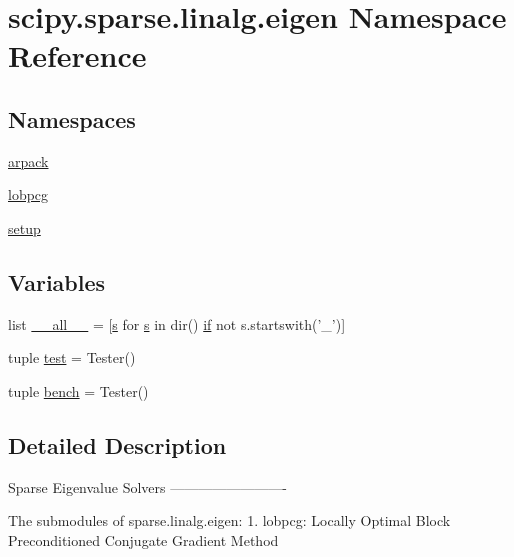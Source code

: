 \hypertarget{namespacescipy_1_1sparse_1_1linalg_1_1eigen}{}\section{scipy.\+sparse.\+linalg.\+eigen Namespace Reference}
\label{namespacescipy_1_1sparse_1_1linalg_1_1eigen}
\subsection*{Namespaces}
\begin{DoxyCompactItemize}
\item 
 \hyperlink{namespacescipy_1_1sparse_1_1linalg_1_1eigen_1_1arpack}{arpack}
\item 
 \hyperlink{namespacescipy_1_1sparse_1_1linalg_1_1eigen_1_1lobpcg}{lobpcg}
\item 
 \hyperlink{namespacescipy_1_1sparse_1_1linalg_1_1eigen_1_1setup}{setup}
\end{DoxyCompactItemize}
\subsection*{Variables}
\begin{DoxyCompactItemize}
\item 
list \hyperlink{namespacescipy_1_1sparse_1_1linalg_1_1eigen_ada87267193e73e0b8fb11d1f19f42e53}{\+\_\+\+\_\+all\+\_\+\+\_\+} = \mbox{[}\hyperlink{indexexpr_8h_ae024b0db549122b44c349ae28ec990dc}{s} for \hyperlink{indexexpr_8h_ae024b0db549122b44c349ae28ec990dc}{s} in dir() \hyperlink{minmax_8h_a30a0ee9fee303f01d9c5e6f669e0dfe9}{if} not s.\+startswith('\+\_\+')\mbox{]}
\item 
tuple \hyperlink{namespacescipy_1_1sparse_1_1linalg_1_1eigen_a9c9e67647d29435fc8366aacab20853c}{test} = Tester()
\item 
tuple \hyperlink{namespacescipy_1_1sparse_1_1linalg_1_1eigen_a17db74fb45765a04d3d42aa9a9879e3c}{bench} = Tester()
\end{DoxyCompactItemize}


\subsection{Detailed Description}
\begin{DoxyVerb}Sparse Eigenvalue Solvers
-------------------------

The submodules of sparse.linalg.eigen:
    1. lobpcg: Locally Optimal Block Preconditioned Conjugate Gradient Method\end{DoxyVerb}
 

